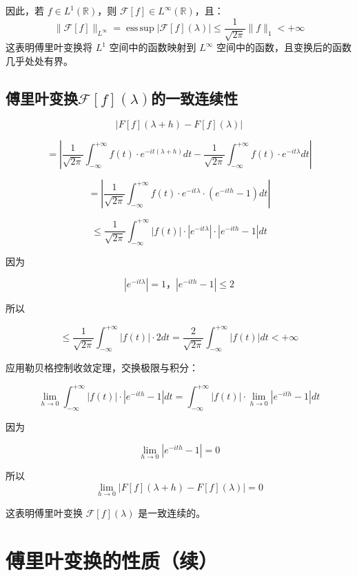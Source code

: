 \documentclass[12pt,a4paper]{article}
\theoremstyle{plain}
\theoremstyle{definition}
\theoremstyle{remark}
\begin{document}
	因此，若 $f \in L^1(\mathbb{R})$，则 $\mathcal{F}[f] \in L^\infty(\mathbb{R})$，且：
	\[
	\|\mathcal{F}[f]\|_{L^\infty} = \operatorname{ess\,sup} |\mathcal{F}[f](\lambda)| \leq \frac{1}{\sqrt{2\pi}} \|f\|_1 < +\infty
	\]
	这表明傅里叶变换将 $L^1$ 空间中的函数映射到 $L^\infty$ 空间中的函数，且变换后的函数几乎处处有界。
	
	\subsection{傅里叶变换\(\mathcal{F}[f](\lambda)\)的一致连续性}
	
	
	\[
	|F[f](\lambda + h) - F[f](\lambda)|
	\]
	
	\[
	= \left| \frac{1}{\sqrt{2\pi}} \int_{-\infty}^{+\infty} f(t) \cdot e^{-it(\lambda + h)} dt - \frac{1}{\sqrt{2\pi}} \int_{-\infty}^{+\infty} f(t) \cdot e^{-it\lambda} dt \right|
	\]
	
	\[
	= \left| \frac{1}{\sqrt{2\pi}} \int_{-\infty}^{+\infty} f(t) \cdot e^{-it\lambda} \cdot (e^{-ith} - 1) dt \right|
	\]
	
	\[
	\leq \frac{1}{\sqrt{2\pi}} \int_{-\infty}^{+\infty} |f(t)| \cdot |e^{-it\lambda}| \cdot |e^{-ith} - 1| dt
	\]
	
	因为
	
	\[
	|e^{-it\lambda}| = 1，	|e^{-ith} - 1| \leq 2
	\]
	
	所以
	
	\[
	\leq \frac{1}{\sqrt{2\pi}} \int_{-\infty}^{+\infty} |f(t)| \cdot 2 dt = \frac{2}{\sqrt{2\pi}} \int_{-\infty}^{+\infty} |f(t)| dt < +\infty
	\]
	
	应用勒贝格控制收敛定理，交换极限与积分：
	
	\[
	\lim_{h \to 0} \int_{-\infty}^{+\infty} |f(t)| \cdot |e^{-ith} - 1| dt = \int_{-\infty}^{+\infty} |f(t)| \cdot \lim_{h \to 0} |e^{-ith} - 1| dt
	\]
	
	因为
	
	\[
	\lim_{h \to 0} |e^{-ith} - 1| = 0
	\]
	
	所以
	\[
	\lim_{h \to 0} |F[f](\lambda + h) - F[f](\lambda)| = 0
	\]
	
	这表明傅里叶变换 \(\mathcal{F}[f](\lambda)\) 是一致连续的。
	
	\section{傅里叶变换的性质（续）}
	
\end{document}
